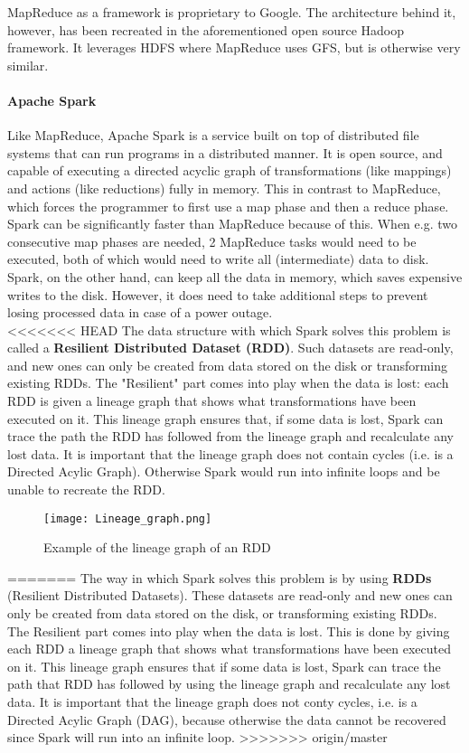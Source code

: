 MapReduce as a framework is proprietary to Google. The architecture behind it, however, has been recreated in the aforementioned open source Hadoop framework. It leverages HDFS where MapReduce uses GFS, but is otherwise very similar.

\paragraph{Apache Spark}
Like MapReduce, Apache Spark is a service built on top of distributed file systems that can run programs in a distributed manner. It is open source, and capable of executing a directed acyclic graph of transformations (like mappings) and actions (like reductions) fully in memory\cite{Sparkwebsite}. This in contrast to MapReduce, which forces the programmer to first use a map phase and then a reduce phase. Spark can be significantly faster than MapReduce because of this. When e.g. two consecutive map phases are needed, 2 MapReduce tasks would need to be executed, both of which would need to write all (intermediate) data to disk. Spark, on the other hand, can keep all the data in memory, which saves expensive writes to the disk. However, it does need to take additional steps to prevent losing processed data in case of a power outage.\\

<<<<<<< HEAD
The data structure with which Spark solves this problem is called a \textbf{Resilient Distributed Dataset (RDD)}. Such datasets are read-only, and new ones can only be created from data stored on the disk or transforming existing RDDs\cite{Zaha12}. The "Resilient" part comes into play when the data is lost: each RDD is given a lineage graph that shows what transformations have been executed on it. This lineage graph ensures that, if some data is lost, Spark can trace the path the RDD has followed from the lineage graph and recalculate any lost data. It is important that the lineage graph does not contain cycles (i.e. is a Directed Acylic Graph). Otherwise Spark would run into infinite loops and be unable to recreate the RDD.

\begin{figure}
	\begin{center}
		\texttt{[image: Lineage\_graph.png]}
	\end{center}
	\caption{Example of the lineage graph of an RDD\cite{Zaha12}}
	\label{lineagegraph}
\end{figure}
=======
The way in which Spark solves this problem is by using \textbf{RDDs} (Resilient Distributed Datasets). These datasets are read-only and new ones can only be created from data stored on the disk, or transforming existing RDDs\cite{Zaha12}. The Resilient part comes into play when the data is lost. This is done by giving each RDD a lineage graph that shows what transformations have been executed on it. This lineage graph ensures that if some data is lost, Spark can trace the path that RDD has followed by using the lineage graph and recalculate any lost data. It is important that the lineage graph does not conty cycles, i.e. is a Directed Acylic Graph (DAG), because otherwise the data cannot be recovered since Spark will run into an infinite loop.
>>>>>>> origin/master
